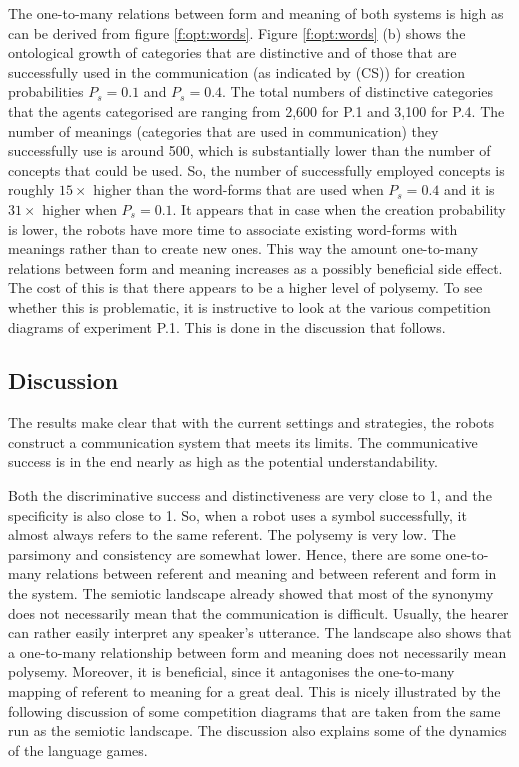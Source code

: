 The one-to-many relations between form and meaning of both systems is high as can be derived from figure \ref{f:opt:words}. Figure \ref{f:opt:words} (b) shows the ontological growth of categories that are distinctive and of those that are successfully used in the communication (as indicated by (CS)) for creation probabilities $P_s=0.1$ and $P_s=0.4$. The total numbers of distinctive categories that the agents categorised are ranging from 2,600 for P.1 and 3,100 for P.4. The number of meanings (categories that are used in communication) they successfully use is around 500, which is substantially lower than the number of concepts that could be used. So, the number of successfully employed concepts is roughly $15 \times$ higher than the word-forms that are used when $P_s=0.4$ and it is $31 \times$ higher when $P_s=0.1$. It appears that in case when the creation probability is lower, the robots have more time to associate existing word-forms with meanings rather than to create new ones. This way the amount one-to-many relations between form and meaning increases as a possibly beneficial side effect. The cost of this is that there appears to be a higher level of polysemy. To see whether this is problematic, it is instructive to look at the various competition diagrams of experiment P.1. This is done in the discussion that follows.


\subsection{Discussion}

The results make clear that with the current settings and strategies, the robots construct a communication system that meets its limits. The communicative success is in the end nearly as high as the potential understandability. 

Both the discriminative success and distinctiveness are very close to 1, and the specificity is also close to 1. So, when a robot uses a symbol successfully, it almost always refers to the same referent. The polysemy is very low. The parsimony and consistency are somewhat lower. Hence, there are some one-to-many relations between referent and meaning and between referent and form in the system. The semiotic landscape already showed that most of the synonymy does not necessarily mean that the communication is difficult. Usually, the hearer can rather easily interpret any speaker's utterance. The landscape also shows that a one-to-many relationship between form and meaning does not necessarily mean polysemy. Moreover, it is beneficial, since it antagonises the one-to-many mapping of referent to meaning for a great deal. This is nicely illustrated by the following discussion of some competition diagrams that are taken from the same run as the semiotic landscape. The discussion also explains some of the dynamics of the language games.

